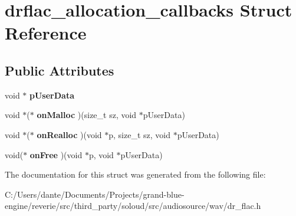 \hypertarget{structdrflac__allocation__callbacks}{}\section{drflac\+\_\+allocation\+\_\+callbacks Struct Reference}
\label{structdrflac__allocation__callbacks}
\subsection*{Public Attributes}
\begin{DoxyCompactItemize}
\item 
\mbox{\label{structdrflac__allocation__callbacks_a08e314b1622e4b194ee1841ec6dc26b4}} 
void $\ast$ {\bfseries p\+User\+Data}
\item 
\mbox{\label{structdrflac__allocation__callbacks_adf04c08f41d18a6a717e471f00554568}} 
void $\ast$($\ast$ {\bfseries on\+Malloc} )(size\+\_\+t sz, void $\ast$p\+User\+Data)
\item 
\mbox{\label{structdrflac__allocation__callbacks_add92a2a10e09907cb3f7fa9e3c8c7fff}} 
void $\ast$($\ast$ {\bfseries on\+Realloc} )(void $\ast$p, size\+\_\+t sz, void $\ast$p\+User\+Data)
\item 
\mbox{\label{structdrflac__allocation__callbacks_a6a92a174fe861d19c71625d8a42d5890}} 
void($\ast$ {\bfseries on\+Free} )(void $\ast$p, void $\ast$p\+User\+Data)
\end{DoxyCompactItemize}


The documentation for this struct was generated from the following file\+:\begin{DoxyCompactItemize}
\item 
C\+:/\+Users/dante/\+Documents/\+Projects/grand-\/blue-\/engine/reverie/src/third\+\_\+party/soloud/src/audiosource/wav/dr\+\_\+flac.\+h\end{DoxyCompactItemize}
